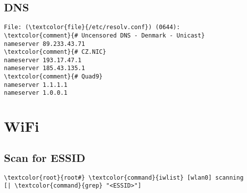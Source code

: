 \documentclass[10pt, a4paper, onecolumn, openany]{book} %
\begin{document}
\subsection{DNS}
\begin{Verbatim}[commandchars=\\\{\}]
File: (\textcolor{file}{/etc/resolv.conf}) (0644):
\textcolor{comment}{# Uncensored DNS - Denmark - Unicast}
nameserver 89.233.43.71
\textcolor{comment}{# CZ.NIC}
nameserver 193.17.47.1
nameserver 185.43.135.1
\textcolor{comment}{# Quad9}
nameserver 1.1.1.1
nameserver 1.0.0.1
\end{Verbatim}


\section{WiFi}
\subsection{Scan for ESSID}
\begin{Verbatim}[commandchars=\\\{\}]
    \textcolor{root}{root#} \textcolor{command}{iwlist} [wlan0] scanning [| \textcolor{command}{grep} "<ESSID>"]
\end{Verbatim}
\end{document}
